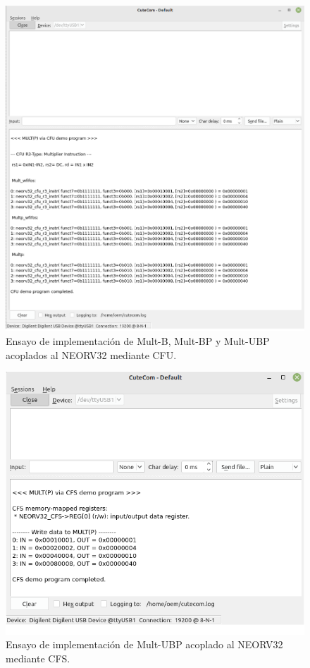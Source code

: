 \begin{figure}[H]
    \centering
    \includegraphics[width=14cm]{Figuras/impl3.png}
    \caption{Ensayo de implementación de Mult-B, Mult-BP y Mult-UBP acoplados al NEORV32 mediante CFU.}
    \label{fig:impl3}
\end{figure}

\begin{figure}[H]
    \centering
    \includegraphics[width=14cm]{Figuras/impl4.png}
    \caption{Ensayo de implementación de Mult-UBP acoplado al NEORV32 mediante CFS.}
    \label{fig:impl4}
\end{figure}


